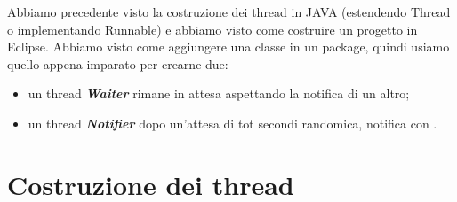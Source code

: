 \begin{table}[ht]
\centering
        \vspace*{2mm}
	\caption{Descrizione Metodi}
	\label{tab:perf}
\end{table}
%
\newline
Abbiamo precedente visto la costruzione dei thread in JAVA (estendendo Thread o implementando
Runnable) e abbiamo visto come costruire un progetto in Eclipse. Abbiamo visto come
aggiungere una classe in un package, quindi usiamo quello appena imparato per crearne due:
\begin{itemize}
    \item un thread \emph{\textbf{Waiter}} rimane in attesa aspettando la notifica di un altro;
    \item un thread \emph{\textbf{Notifier}} dopo un'attesa di tot secondi randomica, notifica con .
\end{itemize}


\section{Costruzione dei thread}

